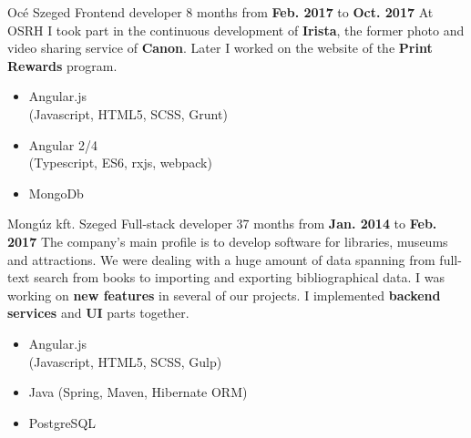 %
\workentry
    {Océ}
    {Szeged}
    {Frontend developer}
    {8 months from \textbf{Feb. 2017} to \textbf{Oct. 2017}}
    {}
    {At OSRH I took part in the continuous development of \textbf{Irista}, the former photo and video sharing service of \textbf{Canon}. Later I worked on the website of the \textbf{Print Rewards} program.}
    {\vspace{-\baselineskip}
    \begin{multicols}{3}
    \begin{itemize}
        \item \small{Angular.js\\(Javascript, HTML5, SCSS, Grunt)}
        \item \small{Angular 2/4\\(Typescript, ES6, rxjs, webpack)}
        \item \small{MongoDb}
    \end{itemize}
    \end{multicols}}
%
\workentry
    {Mongúz kft.}
    {Szeged}
    {Full-stack developer}
    {37 months from \textbf{Jan. 2014} to \textbf{Feb. 2017}}
    {}
    {The company's main profile is to develop software for libraries, museums and attractions. We were dealing with a huge amount of data spanning from full-text search from books to importing and exporting bibliographical data. I was working on \textbf{new features} in several of our projects. I implemented \textbf{backend services} and \textbf{UI} parts together.}
    {\vspace{-\baselineskip}
    \begin{multicols}{2}
    \begin{itemize}
        \item \small{Angular.js\\(Javascript, HTML5, SCSS, Gulp)}
        \item \small{Java (Spring, Maven, Hibernate ORM)}
        \item \small{PostgreSQL}
    \end{itemize}
    \end{multicols}}